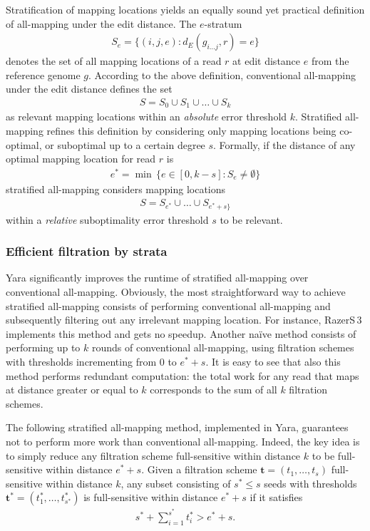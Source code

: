 Stratification of mapping locations yields an equally sound yet practical definition of all-mapping under the edit distance.
The $e$-stratum
\begin{eqnarray}
S_e = \{ (i,j,e) : d_E(g_{i \dots j},r) = e\}
\end{eqnarray}
denotes the set of all mapping locations of a read $r$ at edit distance $e$ from the reference genome $g$.
According to the above definition, conventional all-mapping under the edit distance defines the set
\begin{eqnarray}
S = S_0 \cup S_1 \cup \dots \cup S_k
\end{eqnarray}
as relevant mapping locations within an \emph{absolute} error threshold $k$.
Stratified all-mapping refines this definition by considering only mapping locations being co-optimal, or suboptimal up to a certain degree $s$.
Formally, if the distance of any optimal mapping location for read $r$ is
\begin{eqnarray}
e^* = \min \,\{ e \in [0,k-s] : S_e \neq \emptyset \}
\end{eqnarray}
stratified all-mapping considers mapping locations
\begin{eqnarray}
S = S_{e^*} \cup \dots \cup S_{e^*+s\}}
\end{eqnarray}
within a \emph{relative} suboptimality error threshold $s$ to be relevant.

\subsubsection{Efficient filtration by strata}

Yara significantly improves the runtime of stratified all-mapping over conventional all-mapping.
Obviously, the most straightforward way to achieve stratified all-mapping consists of performing conventional all-mapping and subsequently filtering out any irrelevant mapping location.
For instance, RazerS\,3 implements this method and gets no speedup.
Another na\"ive method consists of performing up to $k$ rounds of conventional all-mapping, using filtration schemes with thresholds incrementing from $0$ to $e^*+s$.
It is easy to see that also this method performs redundant computation: the total work for any read that maps at distance greater or equal to $k$ corresponds to the sum of all $k$ filtration schemes.

The following stratified all-mapping method, implemented in Yara, guarantees not to perform more work than conventional all-mapping.
Indeed, the key idea is to simply reduce any filtration scheme full-sensitive within distance $k$ to be full-sensitive within distance $e^*+s$.
Given a filtration scheme $\mathbf{t}=(t_1,\dots,t_s)$ full-sensitive within distance $k$, any subset consisting of $s^* \leq s$ seeds with thresholds $\mathbf{t^*}=(t^{*}_{1},\dots,t^{*}_{s^*})$ is full-sensitive within distance $e^*+s$ if it satisfies
\begin{eqnarray}
s^* + \sum_{i=1}^{s^*} t_i^* > e^*+s.
\end{eqnarray}

